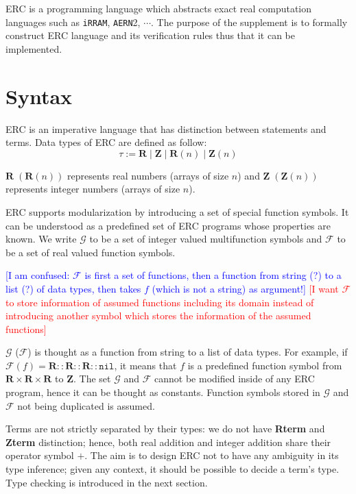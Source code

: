\documentclass{article}
\newcommand{\Martin}[1]{\textcolor{blue}{#1}}
\newcommand{\Sewon}[1]{\textcolor{red}{#1}}
\newcommand{\dreal}{\textbf{R}}
\newcommand{\dint}{\textbf{Z}}
\begin{document}
ERC is a programming language which abstracts exact real computation languages such as 
\texttt{iRRAM}, \texttt{AERN}2, $\cdots$. 
The purpose of the supplement is to formally construct ERC language and its verification rules
thus that it can be implemented.

\section{Syntax}
\label{s:syntax}
ERC is an imperative language that has distinction between statements and terms.
Data types of ERC are defined as follow:
\[
\tau := \textbf{R} \;|\; \textbf{Z} \;|\; \textbf{R}(n)\;|\;\textbf{Z}(n)
\]

$\textbf{R}\;(\textbf{R}(n))$ represents real numbers (arrays of size $n$) and
$\textbf{Z}\;(\textbf{Z}(n))$ represents integer numbers (arrays of size $n$).

ERC supports modularization by introducing a set of special function symbols.
It can be understood as a predefined set of ERC programs whose properties are known. 
We write $\mathcal{G}$ to be a set of integer valued multifunction symbols and
$\mathcal{F}$ to be a set of real valued function symbols.

\Martin{[I am confused: $\mathcal{F}$ is first a set of functions, then a function from string (?)
to a list (?) of data types, then takes $f$ (which is not a string) as argument!]}
\Sewon{[I want $\mathcal{F}$ to store information of assumed functions including its domain instead of 
introducing another symbol which stores the information of the assumed functions]}

$\mathcal{G}$  ($\mathcal{F}$) is thought as a function from string to a list of data types.
For example, if $\mathcal{F}(f) = \dreal :: \dreal :: \dreal :: \texttt{nil}$, it means that $f$ is a predefined 
function symbol from $\dreal \times \dreal \times \dreal$ to $\dint$.
The set $\mathcal{G}$ and $\mathcal{F}$ cannot be modified inside of any ERC program, 
hence it can be thought as constants. 
Function symbols stored in $\mathcal{G}$ and $\mathcal{F}$ not being duplicated is assumed.

\vspace{1em}

Terms are not strictly separated by their types: 
we do not have \textbf{Rterm} and \textbf{Zterm} distinction;
hence, both real addition and integer addition share their operator symbol $+$.
The aim is to design ERC not to have any ambiguity in its type inference; 
given any context, it should be possible to decide a term's type.
Type checking is introduced in the next section.
\end{document}

